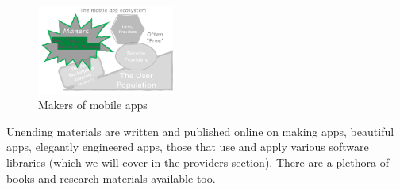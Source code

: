 \begin{figure}
    \centering
    \includegraphics[width=0.4\textwidth]{images/my/the-mobile-app-ecosystem-makers-dtrd.png}
    \caption{Makers of mobile apps}
    \label{fig:my_mobile-app-makers}
\end{figure}

Unending materials are written and published online on making apps, beautiful apps, elegantly engineered apps, those that use and apply various software libraries (which we will cover in the providers section). There are a plethora of books and research materials available too. 



